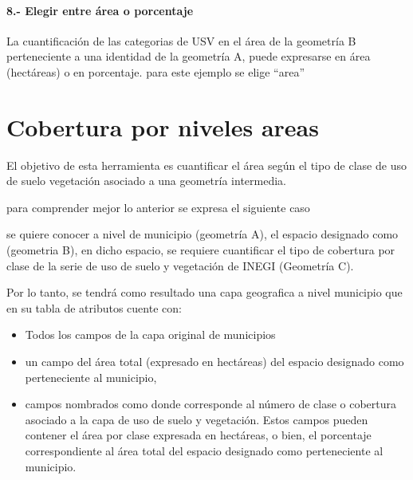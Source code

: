 \documentclass[letterpaper,10pt,spanish]{sphinxmanual}
\begin{document}
\noindent{}


\subsubsection{8.- Elegir entre área o porcentaje}
\label{\detokenize{tabulacion_3geo:elegir-entre-area-o-porcentaje}}
La cuantificación de las categorias de USV en el área de la geometría B perteneciente
a una identidad de la geometría A, puede expresarse en área (hectáreas) o en porcentaje.
para este ejemplo se elige “area”

\noindent{}


\chapter{Cobertura por niveles areas}
\label{\detokenize{nivel_geometrias:cobertura-por-niveles-areas}}\label{\detokenize{nivel_geometrias::doc}}
El objetivo de esta herramienta es cuantificar el área según el tipo de clase
de uso de suelo vegetación asociado a una geometría intermedia.

para comprender mejor lo anterior se expresa el siguiente caso

se quiere conocer a nivel de municipio (geometría A), el espacio designado como 
(geometria B), en dicho espacio, se requiere cuantificar el tipo de cobertura por clase
de la serie de uso de suelo y vegetación de INEGI (Geometría C).

Por lo tanto, se tendrá como resultado una capa geografica a nivel municipio que en su tabla de atributos
cuente con:
\begin{itemize}
\item {} 
Todos los campos de la capa original de municipios

\item {} 
un campo del área total (expresado en hectáreas) del espacio designado como  perteneciente al municipio,

\item {} 
campos nombrados como  donde \sphinxstylestrong{\#} corresponde al número de clase o cobertura asociado a la capa de uso de suelo y vegetación. Estos campos pueden contener el área por clase expresada en hectáreas, o bien, el porcentaje correspondiente al área total del espacio designado como  perteneciente al municipio.

\end{itemize}
\end{document}
